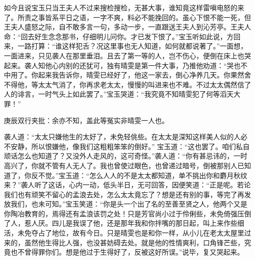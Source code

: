 \begin{parag}
    如今且说宝玉只当王夫人不过来搜检搜检，无甚大事，谁知竟这样雷嗔电怒的来了。所责之事皆系平日之语，一字不爽，料必不能挽回的。虽心下恨不能一死，但王夫人盛怒之际，自不敢多言一句，多动一步，一直跟送王夫人到沁芳亭。王夫人命：“回去好生念念那书，仔细明儿问你。才已发下恨了。”宝玉听如此说，方回来，一路打算：“谁这样犯舌？况这里事也无人知道，如何就都说著了。”一面想，一面进来，只见袭人在那里垂泪。且去了第一等的人，岂不伤心，便倒在床上也哭起来。袭人知他心内别的还犹可，独有晴雯是第一件大事，乃推他劝道：“哭也不中用了。你起来我告诉你，晴雯已经好了，他这一家去，倒心净养几天。你果然舍不得他，等太太气消了，你再求老太太，慢慢的叫进来也不难。不过太太偶然信了人的诽言，一时气头上如此罢了。”宝玉哭道：“我究竟不知晴雯犯了何等滔天大罪！”\begin{note}庚辰双行夹批：余亦不知，盖此等冤实非晴雯一人也。\end{note}袭人道：“太太只嫌他生的太好了，未免轻佻些。在太太是深知这样美人似的人必不安静，所以恨嫌他，像我们这粗粗笨笨的倒好。” 宝玉道：“这也罢了。咱们私自顽话怎么也知道了？又没外人走风的，这可奇怪。”袭人道：“你有甚忌讳的，一时高兴了，你就不管有人无人了。我也曾使过眼色，也曾递过暗号，倒被那别人已知道了，你反不觉。”宝玉道：“怎么人人的不是太太都知道，单不挑出你和麝月秋纹来？”袭人听了这话，心内一动，低头半日，无可回答，因便笑道：“正是呢。若论我们也有顽笑不留心的孟浪去处，怎么太太竟忘了？想是还有别的事，等完了再发放我们，也未可知。”宝玉笑道：“你是头一个出了名的至善至贤之人，他两个又是你陶冶教育的，焉得还有孟浪该罚之处！只是芳官尚小过于伶俐些，未免倚强压倒了人，惹人厌。四儿是我误了他，还是那年我和你拌嘴的那日起，叫上来作些细活，未免夺占了地位，故有今日。只是晴雯也是和你一样，从小儿在老太太屋里过来的，虽然他生得比人强，也没甚妨碍去处。就是他的性情爽利，口角锋芒些，究竟也不曾得罪你们。想是他过于生得好了，反被这好所误。”说毕，复又哭起来。
\end{parag}


